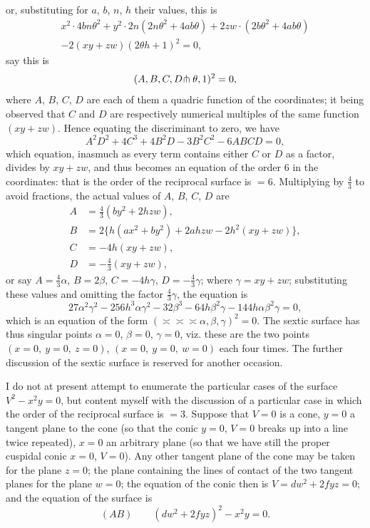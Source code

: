 \documentclass[11pt,a4paper]{article}
\begin{document}
or, substituting for $a$, $b$, $n$, $h$ their values, this is
\begin{multline*}
x^{2} \cdot 4b n\theta^{2} + y^{2} \cdot 2n(2n\theta^{2} + 4ab\theta) + 2zw \cdot (2b\theta^{2} + 4ab\theta)\\
- 2(xy + zw)(2\theta h + 1)^{2} = 0,
\end{multline*}
say this is
\[
(A, B, C, D \hspace{-0.2em}\pitchfork \theta, 1)^{2} = 0,
\]
where $A$, $B$, $C$, $D$ are each of them a quadric function of the coordinates; it being observed that $C$ and $D$ are respectively numerical multiples of the same function $(xy + zw)$. Hence equating the discriminant to zero, we have
\[
A^{2}D^{2} + 4C^{3} + 4B^{2}D - 3B^{2}C^{2} - 6ABCD = 0,
\]
which equation, inasmuch as every term contains either $C$ or $D$ as a factor, divides by $xy + zw$, and thus becomes an equation of the order 6 in the coordinates: that is the order of the reciprocal surface is $=6$. Multiplying by $\frac{4}{3}$ to avoid fractions, the actual values of $A$, $B$, $C$, $D$ are
\begin{align*}
A &= \tfrac{4}{3}(by^{2} + 2hzw),\\
B &= 2\{h(ax^{2} + by^{2}) + 2ahzw - 2h^{2}(xy + zw)\},\\
C &= -4h(xy + zw),\\
D &= -\tfrac{4}{3}(xy + zw),
\end{align*}
or say $A = \frac{4}{3}\alpha$, $B = 2\beta$, $C = -4h\gamma$, $D = -\frac{4}{3}\gamma$; where $\gamma = xy + zw$; substituting these values and omitting the factor $\frac{4}{3}\gamma$, the equation is
\[
27\alpha^{2}\gamma^{2} - 256h^{3}\alpha\gamma^{2} - 32\beta^{3} - 64h\beta^{2}\gamma - 144h\alpha\beta^{2}\gamma = 0,
\]
which is an equation of the form $(\asymp\!\asymp\!\asymp \alpha, \beta, \gamma)^{2} = 0$. The sextic surface has thus singular points $\alpha=0$, $\beta=0$, $\gamma=0$, viz. these are the two points $(x=0,\ y=0,\ z=0)$, $(x=0,\ y=0,\ w=0)$ each four times. The further discussion of the sextic surface is reserved for another occasion.

I do not at present attempt to enumerate the particular cases of the surface $V^{2} - x^{2}y = 0$, but content myself with the discussion of a particular case in which the order of the reciprocal surface is $=3$. Suppose that $V=0$ is a cone, $y=0$ a tangent plane to the cone (so that the conic $y=0$, $V=0$ breaks up into a line twice repeated), $x=0$ an arbitrary plane (so that we have still the proper cuspidal conic $x=0$, $V=0$). Any other tangent plane of the cone may be taken for the plane $z=0$; the plane containing the lines of contact of the two tangent planes for the plane $w=0$; the equation of the conic then is $V = dw^{2} + 2fyz = 0$; and the equation of the surface is
\[
(AB)\qquad (dw^{2} + 2fyz)^{2} - x^{2}y = 0.
\]
\end{document}
